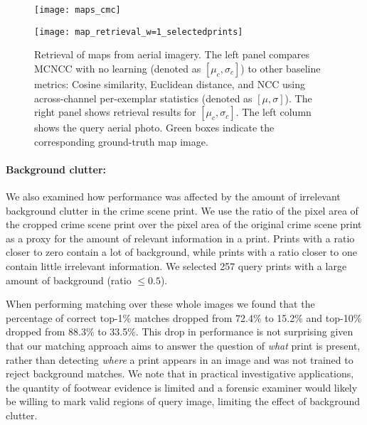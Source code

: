 \documentclass[twocolumn]{svjour3}           %
\begin{document}
\begin{figure*}[t]
\begin{center}
\begin{minipage}{0.45\textwidth}
  \texttt{[image: maps\_cmc]}
\end{minipage}
\begin{minipage}{0.5\textwidth}
  \flushright
  \texttt{[image: map\_retrieval\_w=1\_selectedprints]}
\end{minipage}
\end{center}
\caption{Retrieval of maps from aerial imagery. The left panel compares
  MCNCC with no learning (denoted as $[\mu_c,\sigma_c]$) to other baseline
  metrics: Cosine similarity, Euclidean distance, and NCC using across-channel
  per-exemplar statistics (denoted as $[\mu,\sigma]$). The right panel shows
  retrieval results for $[\mu_c,\sigma_c]$. The left column shows the query
  aerial photo. Green boxes indicate the corresponding ground-truth map image.
  }
\label{fig:map_retrieval}
\end{figure*}

\paragraph{Background clutter:}
We also examined how performance was affected by the amount of irrelevant
background clutter in the crime scene print.  We use the ratio of the pixel
area of the cropped crime scene print over the pixel area of the original
crime scene print as a proxy for the amount of relevant information in a print.
Prints with a ratio closer to zero contain a lot of background, while prints
with a ratio closer to one contain little irrelevant information.  We selected
257 query prints with a large amount of background (ratio $\le 0.5$). 

When performing matching over these whole images we found that the percentage
of correct top-1\% matches dropped from 72.4\% to 15.2\% and top-10\% dropped
from 88.3\% to 33.5\%. This drop in performance is not surprising given that our
matching approach aims to answer the question of \emph{what} print is present,
rather than detecting \emph{where} a print appears in an image and was not
trained to reject background matches. We note that in practical investigative
applications, the quantity of footwear evidence is limited and a forensic
examiner would likely be willing to mark valid regions of query image, limiting
the effect of background clutter.
\end{document}
